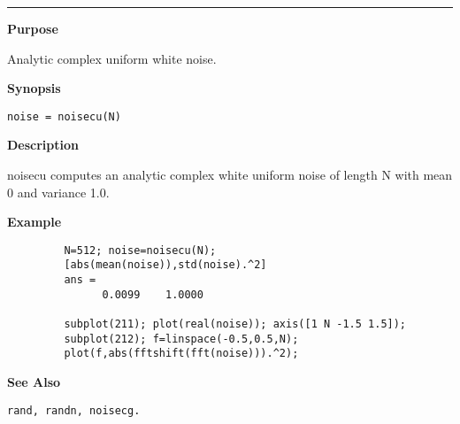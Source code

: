 


\hspace*{-1.6cm}{\Large \bf noisecu}

\vspace*{-.4cm}
\hspace*{-1.6cm}\rule[0in]{16.5cm}{.02cm}
\vspace*{.2cm}



{\bf \large {}\selectfont Purpose}\\
\hspace*{1.5cm}
\begin{minipage}[t]{13.5cm}
Analytic complex uniform white noise.
\end{minipage}
\vspace*{.5cm}


{\bf \large {}\selectfont Synopsis}\\
\hspace*{1.5cm}
\begin{minipage}[t]{13.5cm}
\begin{verbatim}
noise = noisecu(N)
\end{verbatim}
\end{minipage}
\vspace*{.5cm}


{\bf \large {}\selectfont Description}\\
\hspace*{1.5cm}
\begin{minipage}[t]{13.5cm}
        {\ty noisecu} computes an analytic complex white uniform
         noise of length {\ty N} with mean 0 and variance 1.0.\\ 
 
\end{minipage}
\vspace*{.5cm}


{\bf \large {}\selectfont Example}
\begin{verbatim}
         N=512; noise=noisecu(N);
         [abs(mean(noise)),std(noise).^2]
         ans = 
               0.0099    1.0000

         subplot(211); plot(real(noise)); axis([1 N -1.5 1.5]);
         subplot(212); f=linspace(-0.5,0.5,N); 
         plot(f,abs(fftshift(fft(noise))).^2);
\end{verbatim}
\vspace*{.5cm}


{\bf \large {}\selectfont See Also}\\
\hspace*{1.5cm}
\begin{minipage}[t]{13.5cm}
\begin{verbatim}
rand, randn, noisecg.
\end{verbatim}
\end{minipage}
